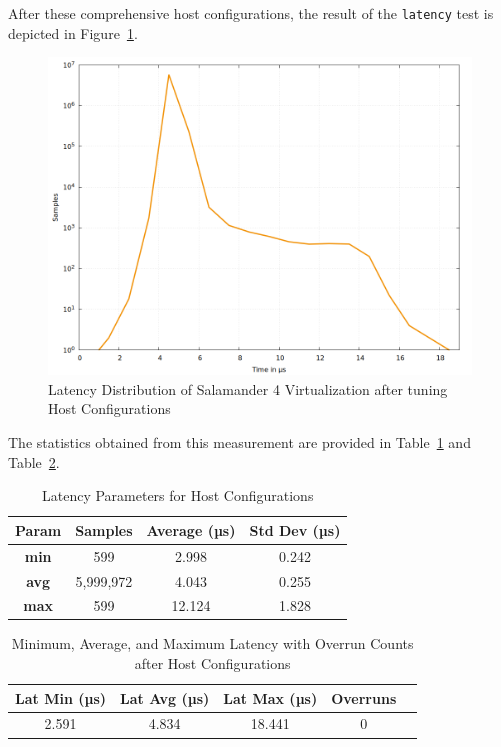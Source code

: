 \documentclass[MMR,Master,english]{twbook}
\begin{document}
\clearpage

\noindent After these comprehensive host configurations, the result of the \texttt{latency} test is depicted in Figure~\ref{fig:max_latency_rt_kernelparam_host}.

\begin{figure}[H]
	\centering
	\includegraphics[width=0.7\columnwidth]{masterthesis-documentation/docs/sigmatek/xenomai/5rt_kernelparam_host/gnuplot_max_latency_rt_kernelparam_host.png}
	\caption[Latency Distribution of Salamander 4 after Host Configurations]{Latency Distribution of Salamander 4 Virtualization after tuning Host Configurations}
	\label{fig:max_latency_rt_kernelparam_host}
\end{figure}

\noindent The statistics obtained from this measurement are provided in Table~\ref{tab:latency_stats_virt_host} and Table~\ref{tab:latency_overrun_msw_new_virt_host}.

\begin{table}[H]
	\centering
	\caption{Latency Parameters for Host Configurations}
	\label{tab:latency_stats_virt_host}
	\begin{tabular}{|c|c|c|c|}
		\hline
		\textbf{Param} & \textbf{Samples} & \textbf{Average (µs)} & \textbf{Std Dev (µs)} \\ \hline
		\textbf{min}   & 599              & 2.998                 & 0.242                 \\ \hline
		\textbf{avg}   & 5,999,972        & 4.043                 & 0.255                 \\ \hline
		\textbf{max}   & 599              & 12.124                & 1.828                 \\ \hline
	\end{tabular}
\end{table}

\begin{table}[H]
	\centering
	\caption[Latency Statistics with Overrun Counts after Host Configurations]{Minimum, Average, and Maximum Latency with Overrun Counts after Host Configurations}
	\label{tab:latency_overrun_msw_new_virt_host}
	\begin{tabular}{|c|c|c|c|c|}
		\hline
		\textbf{Lat Min (µs)} & \textbf{Lat Avg (µs)} & \textbf{Lat Max (µs)} & \textbf{Overruns} \\ \hline
		2.591                 & 4.834                 & 18.441                & 0                 \\ \hline
	\end{tabular}
\end{table}
\end{document}
